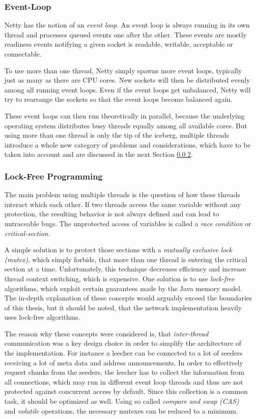 \subsubsection{Event-Loop}
\label{module:core:conc:eventloop}
Netty has the notion of an \emph{event loop}. An event loop is always running in its own thread and processes queued events one after the other. These events are mostly readiness events notifying a given socket is readable, writable, acceptable or connectable.

To use more than one thread, Netty simply spawns more event loops, typically just as many as there are CPU cores. New sockets will then be distributed evenly among all running event loops. Even if the event loops get unbalanced, Netty will try to rearrange the sockets so that the event loops become balanced again.

These event loops can then run theoretically in parallel, because the underlying operating system distributes busy threads equally among all available cores. But using more than one thread is only the tip of the iceberg, multiple threads introduce a whole new category of problems and considerations, which have to be taken into account and are discussed in the next Section \ref{module:core:conc:lockfree}.


\subsubsection{Lock-Free Programming}
\label{module:core:conc:lockfree}
The main problem using multiple threads is the question of how these threads interact which each other. If two threads access the same variable without any protection, the resulting behavior is not always defined and can lead to untraceable bugs. The unprotected access of variables is called a \emph{race condition} or \emph{critical-section}.

A simple solution is to protect those sections with a \emph{mutually exclusive lock (mutex)}, which simply forbids, that more than one thread is entering the critical section at a time. Unfortunately, this technique decreases efficiency and increase thread context switching, which is expensive. One solution is to use \emph{lock-free} algorithms, which exploit certain guarantees made by the Java memory model. The in-depth explanation of these concepts would arguably exceed the boundaries of this thesis, but it should be noted, that the network implementation heavily uses lock-free algorithms.

The reason why these concepts were considered is, that \emph{inter-thread} communication was a key design choice in order to simplify the architecture of the implementation. For instance a leecher can be connected to a lot of seeders receiving a lot of meta data and address announcements. In order to effectively request chunks from the seeders, the leecher has to collect the information from all connections, which may run in different event loop threads and thus are not protected against concurrent access by default. Since this collection is a common task, it should be optimized as well. Using so called \emph{compare and swap (CAS)} and \emph{volatile} operations, the necessary mutexes can be reduced to a minimum. 

